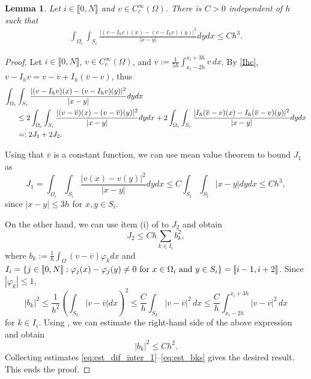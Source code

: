 \documentclass[10 pt]{article}
\newcommand\inter[1]{\llbracket #1\rrbracket}
\newtheorem{lemma}[theorem]{Lemma}
\numberwithin{equation}{section}
\begin{document}
\begin{lemma}\label{lem:stab_dif_interp}
Let $i\in\inter{0,N}$ and $v\in C_c^\infty(\Omega)$. There is $C>0$ independent of $h$ such that
\begin{align}\label{eq:approxim_estimate}
    \int_{\Omega_i}\int_{S_i}\frac{|(v-I_h v)(x)-(v-I_h v)(y)|^2}{|x-y|}dy dx \leq C h^3. 
\end{align}
\end{lemma}
%
\begin{proof}
Let $i\in\inter{0,N}$, $v\in C_c^\infty(\Omega)$, and $\overline {v}:=\frac{1}{5h}\int_{x_i-2h}^{x_i+3h}v\,dx$.
By \eqref{Ihc}, $v-I_h v=v-\overline{v}+I_h(\overline v - v)$, thus
%
\begin{align}\notag
    \int_{\Omega_i}&\int_{S_i}\frac{|(v-I_h v)(x)-(v-I_h v)(y)|^2}{|x-y|} dy dx \\ \notag
    &\leq 2\int_{\Omega_i}\int_{S_i}\frac{|(v-\overline{v})(x)-(v-\overline{v})(y)|^2}{|x-y|}dy dx + 2 \int_{\Omega_i}\int_{S_i}\frac{|I_h(\overline v-{v})(x)-I_h(\overline v-{v})(y)|^2}{|x-y|}dy dx \\ \label{eq:est_dif_inter_1}
    &=:2J_1+2J_2.
\end{align}
%

Using that $\overline v$ is a constant function, we can use mean value theorem to bound $J_1$ as
%
\begin{equation}\label{eq:est_J1}
    J_1 = \int_{\Omega_i}\int_{S_i}\frac{|v(x)-v(y)|^2}{|x-y|}dy dx \leq C \int_{S_i}\int_{S_i}|x-y|dy dx \leq Ch^3,
\end{equation}
since $|x-y|\leq 3h$ for $x,y\in S_i$.

On the other hand, we can use item (i) of  to $J_2$ and obtain
%
\begin{equation}\label{eq:est_J2}
    J_2 \leq Ch\sum_{k\in I_i} b_k^2,
\end{equation}
%
where $b_k:=\frac{1}{h}\int_{\Omega}(v-\overline v)\varphi_k dx$ and $I_i=\{j\in\inter{0,N}:\varphi_j(x)-\varphi_j(y) \neq 0 \ \textnormal{for $x\in \Omega_i$ and $y\in S_i$}\}=\inter{i-1,i+2}$. Since $|\varphi_k|\leq 1$, 
\begin{equation}\label{abk}
    |b_k|^2
    \leq \frac{1}{h^2}\left(\int_{S_k} |v-\overline v|dx\right)^2
    \leq \frac{C}{h}\int_{S_k}|v-\overline{v}|^2\, dx
    \leq \frac{C}{h}\int_{x_i-2h}^{x_i+3h}|v-\overline{v}|^2\, dx
\end{equation}
for $k\in I_i.$ Using , we can estimate the right-hand side of the above expression and obtain
%
\begin{equation}\label{eq:est_bks}
    |b_k|^2\leq Ch^2.
\end{equation}
%
Collecting estimates \eqref{eq:est_dif_inter_1}--\eqref{eq:est_bks} gives the desired result. This ends the proof. 
\end{proof}
\end{document}
